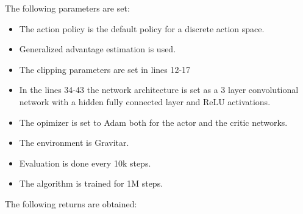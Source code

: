 \documentclass[12pt,a4paper]{report}
\begin{document}
	The following parameters are set:
	\begin{itemize}
		\item The action policy is the default policy for a discrete action space.
		\item Generalized advantage estimation is used.
		\item The clipping parameters are set in lines 12-17
		\item In the lines 34-43 the network architecture is set as a 3 layer convolutional network with a hidden fully connected layer and ReLU activations.
		\item The opimizer is set to Adam both for the actor and the critic networks.
		\item The environment is Gravitar.
		\item Evaluation is done every 10k steps.
		\item The algorithm is trained for 1M steps.
	\end{itemize}
	
	The following returns are obtained:
	
\end{document}
